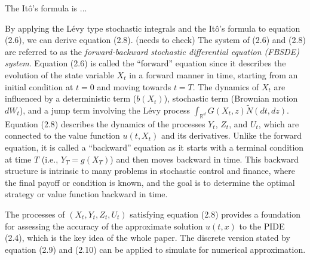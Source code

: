 \documentclass[12pt,letterpaper,oneside]{article}
\begin{document}
	 The It\^o's formula is ...
	 
	 By applying the L\'evy type stochastic integrals and the It\^o's formula to equation (2.6), we can derive equation (2.8). (needs to check)  The system of (2.6) and (2.8) are referred to as the \textit{forward-backward stochastic differential equation (FBSDE) system}. Equation (2.6) is called the ``forward'' equation since it describes the evolution of the state variable \( X_t \) in a forward manner in time, starting from an initial condition at \( t = 0 \) and moving towards \( t = T \). The dynamics of \( X_t \) are influenced by a deterministic term (\( b(X_t) \)), stochastic term (Brownian motion \( dW_t \)), and a jump term involving the Lévy process \( \int_{\mathbb{R}^d} G(X_t, z) \tilde{N}(dt, dz) \). Equation (2.8) describes the dynamics of the processes \( Y_t \), \( Z_t \), and \( U_t \), which are connected to the value function \( u(t, X_t) \) and its derivatives. Unlike the forward equation, it is called a ``backward'' equation as it starts with a terminal condition at time \( T \) (i.e., \( Y_T = g(X_T) \)) and then moves backward in time. This backward structure is intrinsic to many problems in stochastic control and finance, where the final payoff or condition is known, and the goal is to determine the optimal strategy or value function backward in time.
	 
	 The processes of $ (X_t, Y_t, Z_t, U_t) $ satisfying equation (2.8) provides a foundation for assessing the accuracy of the approximate solution $ u(t,x) $ to the PIDE (2.4), which is the key idea of the whole paper. The discrete version stated by equation (2.9) and (2.10) can be applied to simulate for numerical approximation.
\end{document}
